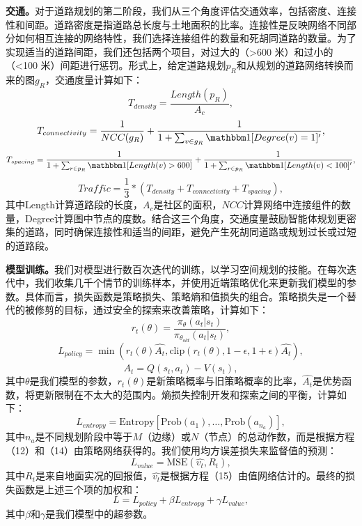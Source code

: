 \textbf{交通。}对于道路规划的第二阶段，我们从三个角度评估交通效率，包括密度、连接性和间距。道路密度是指道路总长度与土地面积的比率。连接性是反映网络不同部分如何相互连接的网络特性，我们选择连接组件的数量和死胡同道路的数量。为了实现适当的道路间距，我们还包括两个项目，对过大的（>600 米）和过小的（<100 米）间距进行惩罚。形式上，给定道路规划$p_R$和从规划的道路网络转换而来的图$g_R$，交通度量计算如下：
\begin{equation}
    T_{density}=\frac{Length(p_{R})}{A_c},
\end{equation}
\begin{equation}
    T_{connectivity}=\frac{1}{NCC(g_R)}+\frac{1}{1+\sum_{v \in g_R}\mathbbm 1[Degree(v)=1]'},
\end{equation}
\begin{equation}
    T_{spacing}=\frac{1}{1+\sum_{r \in p_R}\mathbbm 1[Length(v)>600]}+\frac{1}{1+\sum_{r \in p_R}\mathbbm 1[Length(v)<100]'},
\end{equation}
\begin{equation}
    Traffic=\frac{1}{3}*(T_{density}+T_{connectivity}+T_{spacing}),
\end{equation}
其中Length计算道路段的长度，$A_c$是社区的面积，$NCC$计算网络中连接组件的数量，Degree计算图中节点的度数。结合这三个角度，交通度量鼓励智能体规划更密集的道路，同时确保连接性和适当的间距，避免产生死胡同道路或规划过长或过短的道路段。

\textbf{模型训练。}我们对模型进行数百次迭代的训练，以学习空间规划的技能。在每次迭代中，我们收集几千个情节的训练样本，并使用近端策略优化来更新我们模型的参数。具体而言，损失函数是策略损失、策略熵和值损失的组合。策略损失是一个替代的被修剪的目标，通过安全的探索来改善策略，计算如下：
\begin{equation}
    r_t(\theta) = \frac{\pi_\theta(a_t|s_t)}{\pi_{\theta_{old}}(a_t|s_t)},
\end{equation}
\begin{equation}
    L_{policy} = \min\left(r_t(\theta)\hat{A_t},\text{clip}\left(r_t(\theta),1-\epsilon,1+\epsilon\right)\hat{A_t}\right),
\end{equation}
\begin{equation}
    \hat{A_t} = Q(s_t,a_t)-V(s_t),
\end{equation}
其中$\theta$是我们模型的参数，$r_t(\theta)$是新策略概率与旧策略概率的比率，$\hat{A_t}$是优势函数，将更新限制在不太大的范围内。熵损失控制开发和探索之间的平衡，计算如下：
\begin{equation}
    L_{entropy} = \text{Entropy}\left[\text{Prob}(a_1),\dots,\text{Prob}(a_{n_a})\right],
\end{equation}
其中$n_a$是不同规划阶段中等于$M$（边缘）或$N$（节点）的总动作数，而是根据方程（12）和（14）由策略网络获得的。我们使用均方误差损失来监督值的预测：
\begin{equation}
    L_{value} = \text{MSE}(\hat{v_t},R_t),
\end{equation}
其中$R_t$是来自地面实况的回报值，$\hat{v_t}$是根据方程（15）由值网络估计的。最终的损失函数是上述三个项的加权和：
\begin{equation}
    L = L_{policy}+\beta L_{entropy}+\gamma L_{value},
\end{equation}
其中$\beta$和$\gamma$是我们模型中的超参数。


